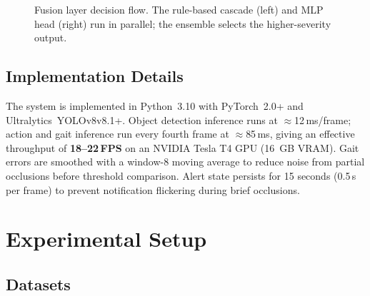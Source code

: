 \documentclass[conference]{IEEEtran}
\begin{document}
\begin{figure}[t]
{}
\caption{Fusion layer decision flow. The rule-based cascade (left) and MLP
head (right) run in parallel; the ensemble selects the higher-severity output.}
\label{fig:fusion}
\end{figure}

\subsection{Implementation Details}

The system is implemented in Python~3.10 with PyTorch~2.0+ and
Ultralytics~YOLOv8v8.1+.
Object detection inference runs at $\approx$12\,ms/frame;
action and gait inference run every fourth frame at $\approx$85\,ms, giving
an effective throughput of \textbf{18--22\,FPS} on an NVIDIA Tesla T4 GPU
(16~GB VRAM).
Gait errors are smoothed with a window-8 moving average to reduce noise from
partial occlusions before threshold comparison.
Alert state persists for 15 seconds (0.5\,s per frame) to prevent
notification flickering during brief occlusions.

\section{Experimental Setup}\label{sec:exp}

\subsection{Datasets}
\end{document}

